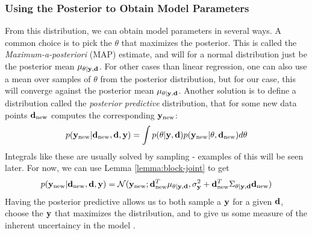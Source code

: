\subsubsection{Using the Posterior to Obtain Model Parameters}
From this distribution, we can obtain model parameters in several ways. 
A common choice is to pick the $\theta$ that maximizes the posterior. This is called the \textit{Maximum-a-posteriori} (MAP) estimate, and will for a normal distribution just be the posterior mean $\mu_{\theta | \mathbf{y}, \mathbf{d}}$.
For other cases than linear regression, one can also use a mean over samples of $\theta$ from the posterior distribution, but for our case, this will converge against the posterior mean $\mu_{\theta | \mathbf{y}, \mathbf{d}}$.
Another solution is to define a distribution called the \textit{posterior predictive} distribution, that for some new data points $\mathbf{d}_{\textrm{new}}$ computes the corresponding $\mathbf{y}_{\textrm{new}}$:
\begin{equation}p(\mathbf{y}_{\textrm{new}} | \mathbf{d}_{\textrm{new}}, \mathbf{d}, \mathbf{y}) = \int p(\theta | \mathbf{y}, \mathbf{d}) p(\mathbf{y}_{\textrm{new}} | \theta, \mathbf{d}_\textrm{new})d\theta\end{equation}
Integrals like these are usually solved by sampling - examples of this will be seen later. For now, we can use Lemma \ref{lemma:block-joint} to get
\begin{equation}p(\mathbf{y}_{\textrm{new}} | \mathbf{d}_{\textrm{new}}, \mathbf{d}, \mathbf{y}) = \mathcal{N}(\mathbf{y}_\textrm{new}; \mathbf{d}_\textrm{new}^T\mu_{\theta|\mathbf{y}, \mathbf{d}}, \sigma^2_{\mathbf{y}} + \mathbf{d}_\textrm{new}^T\Sigma_{\theta | \mathbf{y}, \mathbf{d}}\mathbf{d}_\textrm{new})\end{equation}
Having the posterior predictive allows us to both sample a $\mathbf{y}$ for a given $\mathbf{d}$, choose the $\mathbf{y}$ that maximizes the distribution, and to give us some measure of the inherent uncertaincy in the model \cite{krause22}.


